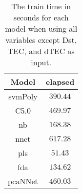 \begin{table}[!ht]
	\centering
	\begin{tabular}{|c|c|}
		\hline
		Model & elapsed \\ \hline
		svmPoly & $390.44$ \\ \hline
		C5.0 & $469.97$ \\ \hline
		nb & $168.38$ \\ \hline
		nnet & $617.28$ \\ \hline
		pls & $51.43$ \\ \hline
		fda & $134.62$ \\ \hline
		pcaNNet & $460.03$ \\ \hline
	\end{tabular}
	\caption{The train time in seconds for each model when using all variables except Dst, TEC, and dTEC as input.}
	\label{tab:time:noTEC:train}
\end{table}
